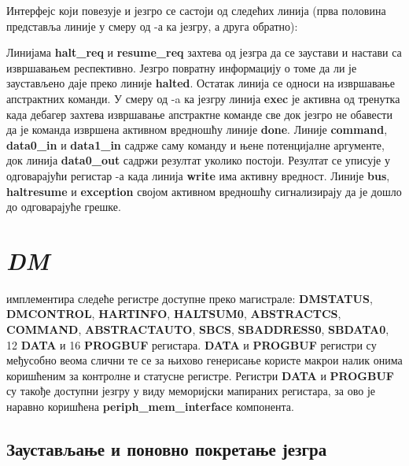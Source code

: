 Интерфејс који повезује  и језгро се састоји од следећих линија (прва половина представља линије у смеру од -а ка језгру, а друга обратно):



Линијама \textbf{halt\_req} и \textbf{resume\_req}  захтева од језгра да се заустави и настави са извршавањем респективно. Језгро повратну информацију о томе да ли је заустављено даје преко линије \textbf{halted}. Остатак линија се односи на извршавање апстрактних команди. У смеру од -a ка језгру линија \textbf{exec} је активна од тренутка када дебагер захтева извршавање апстрактне команде све док језгро не обавести  да је команда извршена активном вредношћу линије \textbf{done}. Линије \textbf{command}, \textbf{data0\_in} и \textbf{data1\_in} садрже саму команду и њене потенцијалне аргументе, док линија \textbf{data0\_out} садржи резултат уколико постоји. Резултат се уписује у одговарајући регистар -а када линија \textbf{write} има активну вредност.
Линије \textbf{bus}, \textbf{haltresume} и \textbf{exception} својом активном вредношћу сигнализирају да је дошло до одговарајуће грешке.

\section{\textit{\acrfull{DM}}}

 имплементира следеће регистре доступне преко  магистрале: \textbf{\acrshort{DMSTATUS}}, \textbf{\acrshort{DMCONTROL}}, \textbf{HARTINFO}, \textbf{\acrshort{HALTSUM}0}, \textbf{\acrshort{ABSTRACTCS}}, \textbf{COMMAND}, \textbf{ABSTRACTAUTO}, \textbf{\acrshort{SBCS}}, \textbf{\acrshort{SBADDRESS}0}, \textbf{\acrshort{SBDATA}0}, 12 \textbf{DATA} и 16 \textbf{\acrshort{PROGBUF}} регистара. \textbf{DATA} и \textbf{\acrshort{PROGBUF}} регистри су међусобно веома слични те се за њихово генерисање користе макрои налик онима коришћеним за контролне и статусне регистре. Регистри \textbf{DATA} и \textbf{\acrshort{PROGBUF}} су такође доступни језгру у виду меморијски мапираних регистара, за ово је наравно коришћена \textbf{periph\_mem\_interface} компонента.



\subsection{Заустављање и поновно покретање језгра}

